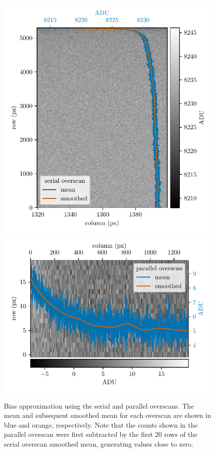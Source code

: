 \begin{figure}
    \centering
    \includegraphics{figures-4/ser_oscan}
    \includegraphics{figures-4/vert_oscan}
    \caption{Bias approximation using the serial and parallel overscans. The mean and subsequent smoothed mean for each overscan are shown in blue and orange, respectively. Note that the counts shown in the parallel overscan were first subtracted by the first 20 rows of the serial overscan smoothed mean, generating values close to zero.}
    \label{fig:overscan}
\end{figure}

